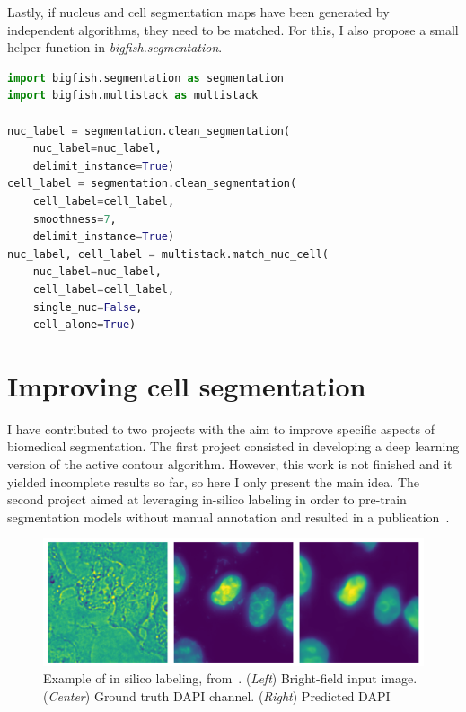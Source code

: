 Lastly, if nucleus and cell segmentation maps have been generated by independent algorithms, they need to be matched.
For this, I also propose a small helper function in \emph{bigfish.segmentation}.\\

\begin{minipage}{0.9\textwidth}
\begin{lstlisting}[language=Python]
import bigfish.segmentation as segmentation
import bigfish.multistack as multistack

nuc_label = segmentation.clean_segmentation(
	nuc_label=nuc_label,
	delimit_instance=True)
cell_label = segmentation.clean_segmentation(
	cell_label=cell_label,
	smoothness=7,
	delimit_instance=True)
nuc_label, cell_label = multistack.match_nuc_cell(
	nuc_label=nuc_label,
	cell_label=cell_label,
	single_nuc=False,
	cell_alone=True)
\end{lstlisting}
\end{minipage}

\section{Improving cell segmentation}
\label{sec:segmentation_improvements}

I have contributed to two projects with the aim to improve specific aspects of biomedical segmentation.
The first project consisted in developing a deep learning version of the active contour algorithm.
However, this work is not finished and it yielded incomplete results so far, so here I only present the main idea.
The second project aimed at leveraging in-silico labeling in order to pre-train segmentation models without manual annotation and resulted in a publication~\cite{Bonte_2022}.

\begin{figure}[]
    \centering
    \includegraphics[width=\textwidth]{figures/chapter3/insilico_prediction}
    \caption[Example of in silico labeling]{Example of in silico labeling, from~\cite{Bonte_2022}.
	(\textit{Left}) Bright-field input image.
	(\textit{Center}) Ground truth DAPI channel.
	(\textit{Right}) Predicted DAPI}
    \label{fig:example_insilico}
\end{figure}

